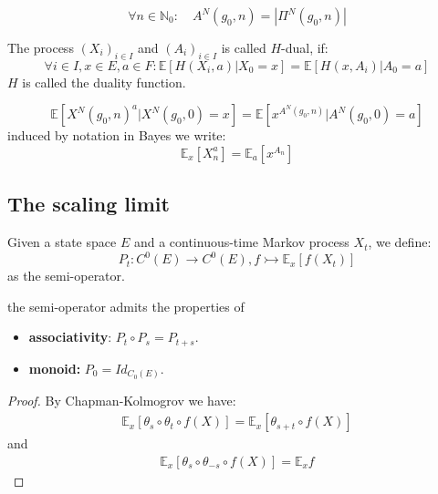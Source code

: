 \begin{definition}
\begin{equation*}
	\forall n \in \mathbb{N}_0: \quad A^N(g_0, n) = |\Pi^N(g_0, n)|
\end{equation*}
\end{definition}

\begin{definition}[Duality]
	The process $(X_i)_{i \in I}$ and $(A_i)_{i \in I}$ is called $H$-dual, if:
	\begin{equation*}
		\forall i \in I, x \in E, a \in F: 
		\mathbb{E}[H(X_i, a) |X_0 = x] = \mathbb{E}[H(x, A_i) | A_0 = a]
	\end{equation*}
	$H$ is called the duality function.
\end{definition}

\begin{theorem}
	\begin{equation*}
		\mathbb{E}[X^N(g_0, n)^a|X^N(g_0, 0) = x] = \mathbb{E}[x^{A^N(g_0, n)}  |A^N(g_0, 0) = a]
	\end{equation*}
	induced by notation in Bayes we write:
	\begin{equation*}
		\mathbb{E}_x[X_n^a] = \mathbb{E}_a[x^{A_n}]
	\end{equation*}
\end{theorem}


\subsection{The scaling limit}
\begin{definition}
Given a state space $E$ and a continuous-time Markov process $X_t$, we define:
\begin{equation*}
	P_t: C^0(E) \rightarrow C^0(E), f \rightarrowtail \mathbb{E}_x[f(X_t)] 
\end{equation*}
as the semi-operator.
\end{definition}

\begin{theorem}
	the semi-operator admits the properties of
\begin{itemize}
	\item \textbf{associativity}: $P_t \circ P_s = P_{t + s}$.
	\item \textbf{monoid:} $P_0 = Id_{C_0(E)}$.
\end{itemize}
\end{theorem}
\begin{proof}
	By Chapman-Kolmogrov we have:
	\begin{align*}
		\mathbb{E}_x [\theta_s \circ \theta_t \circ f(X)] 
	   =\mathbb{E}_x[\theta_{s + t} \circ f(X) ]
	\end{align*}
	and 
	\begin{align*}
		\mathbb{E}_x[\theta_s \circ \theta_{-s} \circ f(X)] = \mathbb{E}_x f
	\end{align*}
\end{proof}

